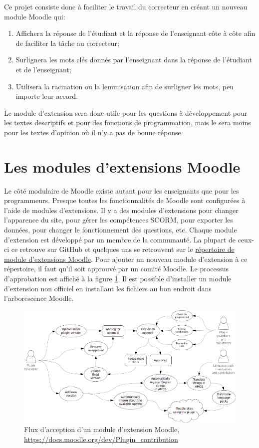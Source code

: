 Ce projet consiste donc à faciliter le travail du correcteur en créant un nouveau module Moodle qui:

\begin{enumerate}
  \item Affichera la réponse de l'étudiant et la réponse de l'enseignant côte à côte afin de faciliter la tâche au correcteur;
  \item Surlignera les mots clés donnés par l'enseignant dans la réponse de l'étudiant et de l'enseignant;
  \item Utilisera la racination ou la lemmisation afin de surligner les mots, peu importe leur accord.
\end{enumerate}

Le module d'extension sera donc utile pour les questions à développement pour les textes descriptifs et pour des fonctions de programmation, mais le sera moins pour les textes d'opinion où il n'y a pas de \og bonne \fg{} réponse.

\section{Les modules d'extensions Moodle}

Le côté modulaire de Moodle existe autant pour les enseignants que pour les programmeurs.
Presque toutes les fonctionnalités de Moodle sont configurées à l'aide de modules d'extensions.
Il y a des modules d'extensions pour changer l'apparence du site, pour gérer les compétences SCORM, pour exporter les données, pour changer le fonctionnement des questions, etc.
Chaque module d'extension est développé par un membre de la communauté.
La plupart de ceux-ci ce retrouve sur GitHub et quelques uns se retrouvent sur le \href{https://moodle.org/plugins/}{répertoire de module d'extensions Moodle}.
Pour ajouter un nouveau module d'extension à ce répertoire, il faut qu'il soit approuvé par un comité Moodle.
Le processus d'approbation est affiché à la figure \ref{plugin-workflow}.
Il est possible d'installer un module d'extension non officiel en installant les fichiers au bon endroit dans l'arborescence Moodle.

\begin{figure}[h!]
  \includegraphics[scale=0.7]{images/plugin-contribution-workflow.png}
  \caption[Flux d'acception d'un module d'extension Moodle]{Flux d'acception d'un module d'extension Moodle, \href{https://docs.moodle.org/dev/Plugin_contribution}{\mbox{https://docs.moodle.org/dev/Plugin\_contribution}}}
  \label{plugin-workflow}
\end{figure}

